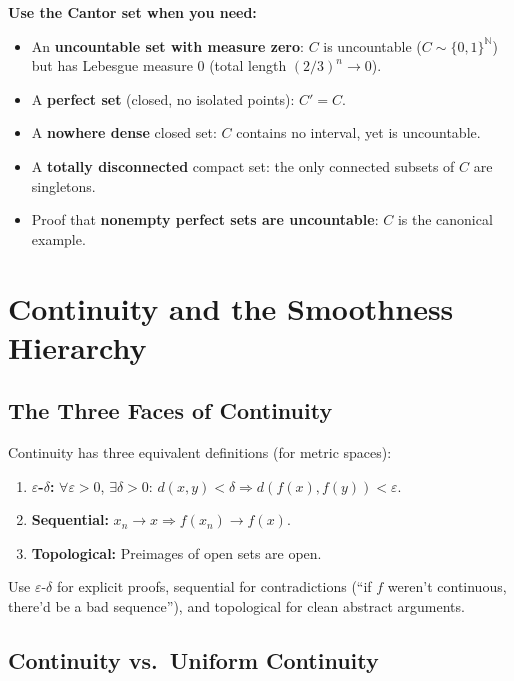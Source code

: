 \documentclass[11pt]{article}
\newcommand{\N}{\mathbb{N}}
\newcommand{\eps}{\varepsilon}
\theoremstyle{definition}
\begin{document}
\begin{application}
\textbf{Use the Cantor set when you need:}
\begin{itemize}
\item An \textbf{uncountable set with measure zero}: $C$ is uncountable ($C \sim \{0,1\}^\N$) but has Lebesgue measure $0$ (total length $(2/3)^n \to 0$).
\item A \textbf{perfect set} (closed, no isolated points): $C' = C$.
\item A \textbf{nowhere dense} closed set: $C$ contains no interval, yet is uncountable.
\item A \textbf{totally disconnected} compact set: the only connected subsets of $C$ are singletons.
\item Proof that \textbf{nonempty perfect sets are uncountable}: $C$ is the canonical example.
\end{itemize}
\end{application}

\section{Continuity and the Smoothness Hierarchy}

\subsection{The Three Faces of Continuity}

Continuity has three equivalent definitions (for metric spaces):
\begin{enumerate}
\item \textbf{$\eps$-$\delta$:} $\forall \eps > 0$, $\exists \delta > 0$: $d(x, y) < \delta \Rightarrow d(f(x), f(y)) < \eps$.
\item \textbf{Sequential:} $x_n \to x \Rightarrow f(x_n) \to f(x)$.
\item \textbf{Topological:} Preimages of open sets are open.
\end{enumerate}

Use $\eps$-$\delta$ for explicit proofs, sequential for contradictions (``if $f$ weren't continuous, there'd be a bad sequence''), and topological for clean abstract arguments.

\subsection{Continuity vs.\ Uniform Continuity}
\end{document}
